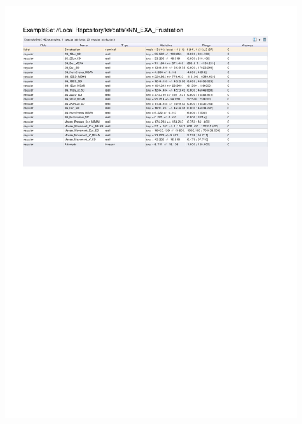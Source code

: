 \begin{figure}[htp]
  \centerline{\includegraphics[trim=0 555 0 60,clip,width=16.09cm]{results/kNN_EXA_Frustration.pdf}} \caption{
} \label{kNN_K_Frustration}
\end{figure}

